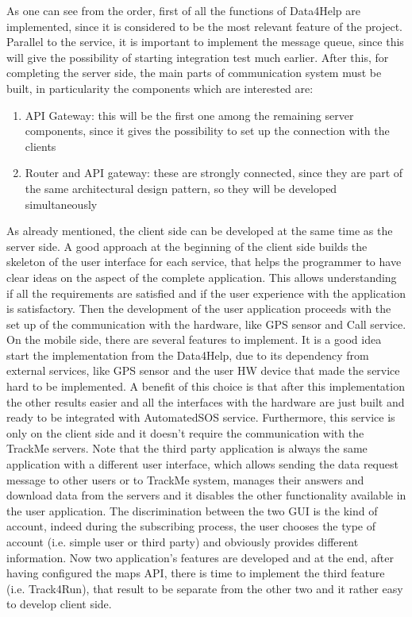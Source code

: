 As one can see from the order, first of all the functions of Data4Help are implemented, since it is
considered to be the most relevant feature of the project. \\ 
Parallel to the service, it is important to implement the message queue, since this will give the 
possibility of starting integration test much earlier. 
 After this, for completing the server side, the main parts of communication system must be built, in
particularity the components which are interested are: 
\begin{enumerate}
\item API Gateway: this will be the first one among the remaining server components, since it gives the
possibility to set up the connection with the clients
\item Router and API gateway: these are strongly connected, since they are part of the same architectural
design pattern, so they will be developed simultaneously
\end{enumerate}
\par
As already mentioned, the client side can be developed at the same time as the server side. 
A good approach at the beginning of the client side builds the skeleton of the user interface for each service, that helps the programmer to have clear ideas on the aspect of the complete application. This allows understanding if all the requirements are satisfied and if the user experience with the application is satisfactory. 
Then the development of the user application proceeds with the set up of the communication with the hardware,
like GPS sensor and Call service. \\
On the mobile side, there are several features to implement. It is a good idea start the implementation from the Data4Help, due to its dependency from external services, like GPS sensor and the user HW device that made the service hard to be implemented. A benefit of this choice is that after this implementation the other results easier and all the interfaces with the hardware are just built and ready to be integrated with AutomatedSOS service. Furthermore, this service is only on the client side and it doesn't require the communication with the TrackMe servers. Note that the third party application is always the same application with a different user interface, which allows sending the data request message to other users or to TrackMe system, manages their answers and download data from the servers and it disables the other functionality available in the user application. The discrimination between the two GUI is the kind of account, indeed during the subscribing process, the user chooses the type of account (i.e. simple user or third party) and obviously provides different information. Now two application's features are developed and at the end, after having configured the maps API, there is time to implement the third feature (i.e. Track4Run), that result to be separate from the other two and it rather easy to develop client side.